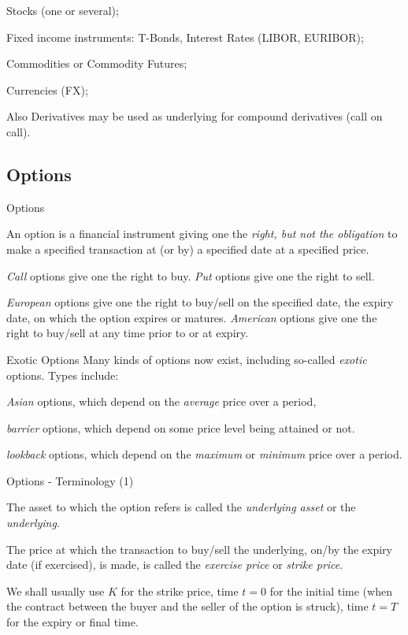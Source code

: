 \item<1-> Stocks (one or several);
\item<2-> Fixed income instruments: T-Bonds, Interest Rates (LIBOR, EURIBOR);
\item<3-> Commodities or Commodity Futures;
\item<4-> Currencies (FX);
\item<5-> Also Derivatives may be used as underlying for compound derivatives (call on call).

\subsection{Options}

{Options}

 \item<1->  An option is a financial instrument giving one the {\it right, but
not the obligation} to make a specified transaction at (or by) a
specified date at a specified price.
\item<2->{\it Call} options give one
the right to buy. {\it Put} options give one the right to sell.
\item<3-> {\it European} options give one the right to buy/sell on the
specified date, the expiry date, on which the option expires or
matures. {\it American} options give one the right to buy/sell at any time
prior to or at expiry.

{Exotic Options}
Many kinds of options now exist, including so-called {\it exotic}
options.  Types include:
  \item<1-> {\it Asian} options, which depend on the
{\it average} price over a period,
\item<2-> {\it barrier} options, which depend on some price level being
attained or not.
\item<3-> {\it lookback} options, which
depend on the  {\it maximum} or {\it minimum} price over a period.

{Options - Terminology (1)}

\item<1-> The asset to which the option refers is called the {\it underlying
asset} or the {\it underlying}.
\item<2->
The price at which the transaction
to buy/sell the underlying, on/by the expiry date (if exercised),
is made, is called the {\it exercise price} or {\it strike price}.
\item<3-> We shall usually use $K$ for the strike price, time $t = 0$ for
the initial time (when the contract between the buyer and the
seller of the option is struck), time $t = T$ for the expiry or
final time.

